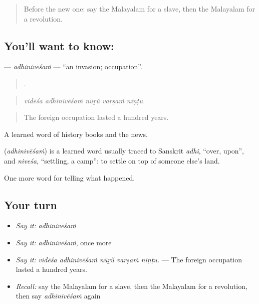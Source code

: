 \label{lesson:ML-C401-adhinivesam}



\begin{quote}
Before the new one: say the Malayalam for a slave, then the Malayalam for a revolution.
\end{quote}

\subsection*{You'll want to know: }
\textbf{} — \emph{adhinivēśaṁ} — \textquotedblleft{}an invasion; occupation\textquotedblright{}.

\begin{quote}
    .
\end{quote}

\begin{quote}
\emph{vidēśa adhinivēśaṁ nūṟŭ varṣaṁ nīṇṭu.}
\end{quote}

\begin{quote}
The foreign occupation lasted a hundred years.
\end{quote}

A learned word of history books and the news.

\begin{cousinweb}
\textbf{} (\emph{adhinivēśaṁ}) is a learned word usually traced to Sanskrit \emph{adhi}, \textquotedblleft{}over, upon\textquotedblright{}, and \emph{niveśa}, \textquotedblleft{}settling, a camp\textquotedblright{}: to settle on top of someone else's land.
\end{cousinweb}

\begin{grammarlens}[title={What you've built}]
One more word for telling what happened.
\end{grammarlens}

\subsection*{Your turn}
\begin{itemize}
\raggedright
  \item \emph{Say it:} \emph{adhinivēśaṁ}
  \item \emph{Say it:} \emph{adhinivēśaṁ}, once more
  \item \emph{Say it:} \emph{vidēśa adhinivēśaṁ nūṟŭ varṣaṁ nīṇṭu.} — The foreign occupation lasted a hundred years.
  \item \emph{Recall:} say the Malayalam for a slave, then the Malayalam for a revolution, then say \emph{adhinivēśaṁ} again
\end{itemize}

